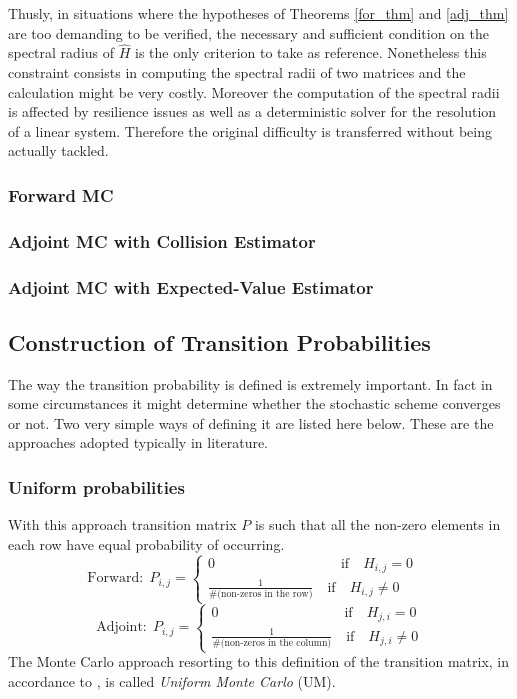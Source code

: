 Thusly, in situations where the hypotheses of Theorems \ref{for_thm} and
\ref{adj_thm} are too demanding to be verified, the necessary and sufficient
condition
on the
spectral radius of $\hat{H}$ is the only criterion to take as reference.
Nonetheless this constraint consists in
computing the spectral radii of two matrices and the calculation
might be very costly. Moreover the computation of the spectral radii is
affected by resilience issues as well as
a deterministic solver for the resolution of
a linear system. Therefore the original difficulty is transferred without being
actually tackled.

\subsubsection{Forward MC}

\subsubsection{Adjoint MC with Collision Estimator}

\subsubsection{Adjoint MC with Expected-Value Estimator}

\subsection{Construction of Transition Probabilities}

The way the transition probability is defined is extremely important. In fact
in some circumstances it might determine whether the stochastic scheme
converges or not. Two very simple ways of defining it are listed here
below. These are the approaches adopted typically in literature.

\subsubsection{Uniform probabilities}
With this approach transition matrix $P$ is such that all the non-zero elements
in each row have equal probability of occurring.
\[
\text{Forward}:\;P_{i,j}=
\begin{cases}
0 \quad \quad \quad \qquad \qquad \qquad \text{if}\quad H_{i,j}=0 \\
\frac{1}{\#(\text{non-zeros in the row)}} \quad \text{if} \quad H_{i,j}\ne 0
\end{cases}\quad
\]
\[
\text{Adjoint}:\;P_{i,j}=
\begin{cases}
0 \quad \quad \quad \qquad \qquad \qquad \text{if}\quad H_{j,i}=0 \\
\frac{1}{\#(\text{non-zeros in the column)}} \quad \text{if} \quad H_{j,i}\ne 0
\end{cases}
\]
The Monte Carlo approach resorting to this definition of the transition matrix,
in accordance to \cite{AADBTW2005}, is called \textit{Uniform Monte Carlo} (UM).

